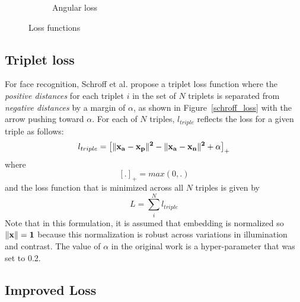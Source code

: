 \begin{figure}[htb]
\begin{subfigure}[t]{0.23\textwidth}
        \caption{Angular loss}
        \label{angular_loss}
    \end{subfigure}
    \caption{Loss functions}
\end{figure}

\subsection{Triplet loss}

For face recognition, Schroff et al. \cite{DBLP:conf/cvpr/SchroffKP15}
propose a triplet loss function where the \textit{positive distances}
for each triplet $i$ in the set of $N$ triplets is separated from
\textit{negative distances} by a margin of $\alpha$, as shown in
Figure~\ref{schroff_loss} with the arrow pushing toward $\alpha$.  For
each of $N$ triples, $l_{triple}$ reflects the loss for a given triple
as follows: 
\begin{equation}
  l_{triple} =  \left[\|\bf{x_a} - \bf{x_p}\|^2 - \|\bf{x_a} -\bf{x_n}\|^2 + \alpha \right]_+
\label{schroff}
\end{equation}
where
\begin{equation}
 \left[.\right]_{+} = max(0, .)
\end{equation}
and the loss function that is minimized across all $N$ triples is given by
\begin{equation}
 L = \sum_{i}^{N} l_{triple}
\end{equation}
Note that in this formulation, it is assumed that embedding is normalized so $\|\bf{x} \| = 1$ because this normalization is robust across variations in illumination and contrast.  The value of $\alpha$ in the original work is a hyper-parameter that \cite{DBLP:conf/cvpr/SchroffKP15} was set to 0.2.

\subsection{Improved Loss}

